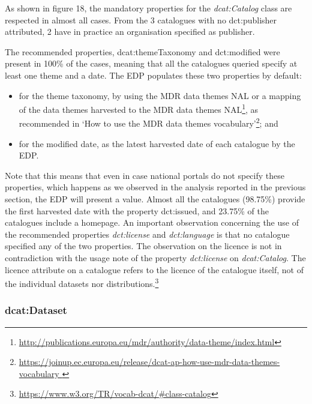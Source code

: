 \documentclass[<options>]{elsarticle}
\begin{document}
As shown in figure 18, the mandatory properties for the \textit{dcat:Catalog} class are respected in almost all cases. From the 3 catalogues with no dct:publisher attributed, 2  have in practice an organisation specified as publisher.

The recommended properties, dcat:themeTaxonomy and dct:modified were present in 100\% of the cases, meaning that all the catalogues queried specify at least one theme and a date. The EDP populates these two properties by default:
\begin{itemize}
\item for the theme taxonomy, by using the MDR data themes NAL or a mapping of the data themes harvested to the MDR data themes NAL\footnote{\href{http://publications.europa.eu/mdr/authority/data-theme/index.html}{ http://publications.europa.eu/mdr/authority/data-theme/index.html}}, as recommended in ‘How to use the MDR data themes vocabulary’\footnote{\href{https://joinup.ec.europa.eu/release/dcat-ap-how-use-mdr-data-themes-vocabulary}{  https://joinup.ec.europa.eu/release/dcat-ap-how-use-mdr-data-themes-vocabulary }}; and
\item for the modified date, as the latest harvested date of each catalogue by the EDP.
\end{itemize}
Note that this means that even in case national portals do not specify these properties, which happens as we observed in the analysis reported in the previous section, the EDP will present a value. Almost all the catalogues (98.75\%) provide the first harvested date with the property dct:issued, and 23.75\% of the catalogues include a homepage. 
An important observation concerning the use of the recommended properties \textit{dct:license} and \textit{dct:language} is that no catalogue specified any of the two properties. The observation on the licence is not in contradiction with the usage note of the property \textit{dct:license} on \textit{dcat:Catalog}. The licence attribute on a catalogue refers to the licence of the catalogue itself, not of the individual datasets nor distributions.\footnote{\href{https://www.w3.org/TR/vocab-dcat/\#class-catalog}{https://www.w3.org/TR/vocab-dcat/\#class-catalog}} 

\subsubsection{dcat:Dataset}
\end{document}
